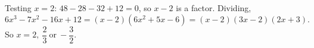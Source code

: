 Testing $x=2$: $48-28-32+12=0$, so $x-2$ is a factor. Dividing,
\[6x^3-7x^2-16x+12=(x-2)\left(6x^2+5x-6\right)=(x-2)(3x-2)(2x+3).\]
So $x=\boxed{2,\ \dfrac23\ \text{or}\ -\dfrac32}$.
